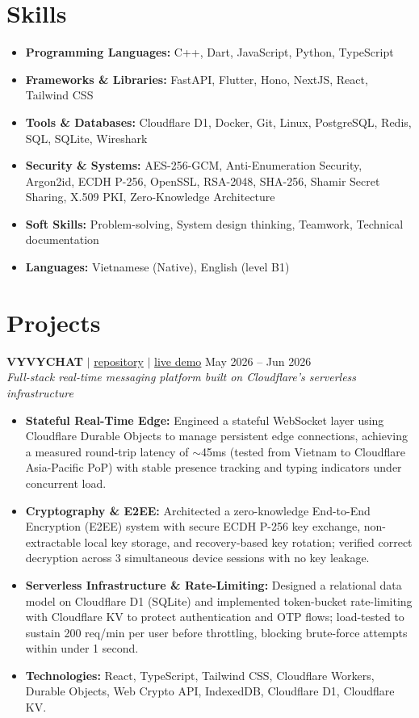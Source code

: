 \documentclass[10pt,a4paper]{article}
\begin{document}
\section*{Skills}
\begin{itemize}[leftmargin=0.15in, label={}, itemsep=0pt]
    \item \textbf{Programming Languages:} C++, Dart, JavaScript, Python, TypeScript
    \item \textbf{Frameworks \& Libraries:} FastAPI, Flutter, Hono, NextJS, React, Tailwind CSS
    \item \textbf{Tools \& Databases:} Cloudflare D1, Docker, Git, Linux, PostgreSQL, Redis, SQL, SQLite, Wireshark
    \item \textbf{Security \& Systems:} AES-256-GCM, Anti-Enumeration Security, Argon2id, ECDH P-256, OpenSSL, RSA-2048, SHA-256, Shamir Secret Sharing, X.509 PKI, Zero-Knowledge Architecture
    \item \textbf{Soft Skills:} Problem-solving, System design thinking, Teamwork, Technical documentation
    \item \textbf{Languages:} Vietnamese (Native), English (level B1)
\end{itemize}

\section*{Projects}

\noindent \textbf{VYVYCHAT} $|$ \href{https://github.com/vyquochuy/vyvychat}{repository} $|$ \href{https://vyvychat.myvault-service.workers.dev/}{live demo} \hfill May 2026 -- Jun 2026\\
\textit{Full-stack real-time messaging platform built on Cloudflare's serverless infrastructure}
\begin{itemize}[leftmargin=0.25in, nosep]
    \item \textbf{Stateful Real-Time Edge:} Engineed a stateful WebSocket layer using Cloudflare Durable Objects to manage persistent edge connections, achieving a measured round-trip latency of $\sim$45ms (tested from Vietnam to Cloudflare Asia-Pacific PoP) with stable presence tracking and typing indicators under concurrent load.
    \item \textbf{Cryptography \& E2EE:} Architected a zero-knowledge End-to-End Encryption (E2EE) system with secure ECDH P-256 key exchange, non-extractable local key storage, and recovery-based key rotation; verified correct decryption across 3 simultaneous device sessions with no key leakage.
    \item \textbf{Serverless Infrastructure \& Rate-Limiting:} Designed a relational data model on Cloudflare D1 (SQLite) and implemented token-bucket rate-limiting with Cloudflare KV to protect authentication and OTP flows; load-tested to sustain 200 req/min per user before throttling, blocking brute-force attempts within under 1 second.
    \item \textbf{Technologies:} React, TypeScript, Tailwind CSS, Cloudflare Workers, Durable Objects, Web Crypto API, IndexedDB, Cloudflare D1, Cloudflare KV.
\end{itemize}
\vspace{10pt}
\end{document}
